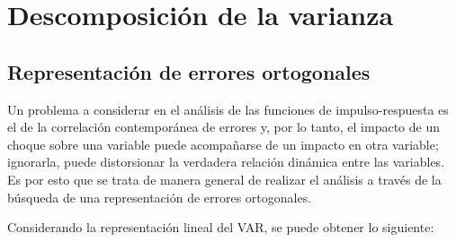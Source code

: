 \section{Descomposici\'{o}n de la varianza}
\subsection{Representaci\'{o}n de errores ortogonales }

Un problema a considerar en el an\'{a}lisis de las funciones de impulso-respuesta es el de la correlaci\'{o}n contempor\'{a}nea de errores y, por lo tanto, el impacto de un choque sobre una variable puede acompa\~{n}arse de un impacto en otra variable; ignorarla, puede distorsionar la verdadera relaci\'{o}n din\'{a}mica entre las variables. Es por esto que se trata de manera general de realizar el an\'{a}lisis a trav\'{e}s de la b\'{u}squeda de una representaci\'{o}n de errores ortogonales. \newline

Considerando la representaci\'{o}n lineal del VAR, se puede obtener lo siguiente:

